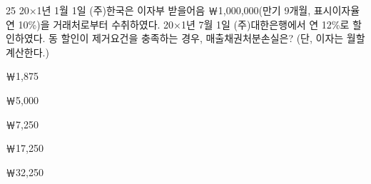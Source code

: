 \begin{question}{25}
20×1년 1월 1일 (주)한국은 이자부 받을어음 ￦1,000,000(만기 9개월, 표시이자율 연 10\%)을 거래처로부터 수취하였다. 20×1년 7월 1일 (주)대한은행에서 연 12\%로 할인하였다. 동 할인이 제거요건을 충족하는 경우, 매출채권처분손실은? (단, 이자는 월할 계산한다.)
\begin{choices}
  \item ￦1,875
  \item ￦5,000
  \item ￦7,250
  \item ￦17,250
  \item ￦32,250
\end{choices}
\end{question}
